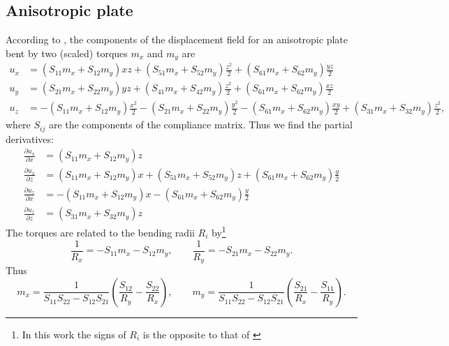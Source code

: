 \documentclass[11pt,a4paper]{article}
\begin{document}
\subsection{Anisotropic plate}
According to \cite{Sanchez_del_Rio_2015}, the components of the displacement field for an anisotropic plate bent by two (scaled) torques $m_x$ and $m_y$ are
\begin{align}
u_x &= (S_{11} m_x + S_{12} m_y) x z + (S_{51} m_x + S_{52} m_y)\frac{z^2}{2} + (S_{61} m_x +S_{62} m_y) \frac{y z}{2} \\
u_y &= (S_{21} m_x + S_{22} m_y) y z + (S_{41} m_x + S_{42} m_y)\frac{z^2}{2} + (S_{61} m_x +S_{62} m_y) \frac{x z}{2} \\
u_z &= -(S_{11} m_x + S_{12} m_y)\frac{x^2}{2} -(S_{21} m_x + S_{22} m_y)\frac{y^2}{2} -(S_{61} m_x +S_{62} m_y) \frac{x y}{2} +(S_{31} m_x + S_{32} m_y)\frac{z^2}{2},
\end{align} 
where $S_{ij}$ are the components of the compliance matrix. Thus we find the partial derivatives:
\begin{align}
\frac{\partial u_x}{\partial x} &= (S_{11} m_x + S_{12} m_y) z \\
\frac{\partial u_x}{\partial z} &= (S_{11} m_x + S_{12} m_y) x + (S_{51} m_x + S_{52} m_y) z 
+ (S_{61} m_x + S_{62} m_y) \frac{y}{2}\\
\frac{\partial u_z}{\partial x} &= -(S_{11} m_x + S_{12} m_y) x -(S_{61} m_x + S_{62} m_y) \frac{y}{2} \\
\frac{\partial u_z}{\partial z} &= (S_{31} m_x + S_{32} m_y) z
\end{align} 
The torques are related to the bending radii $R_i$ by\footnote{In this work the signs of $R_i$ is the opposite to that of \cite{Sanchez_del_Rio_2015}}
\begin{equation}
\frac{1}{R_x} = -S_{11} m_x - S_{12} m_y, \qquad
\frac{1}{R_y} = -S_{21} m_x - S_{22} m_y.
\end{equation}
Thus
\begin{equation}
m_x = \frac{1}{S_{11}S_{22}-S_{12}S_{21}}\left(\frac{S_{12}}{R_y}-\frac{S_{22}}{R_x} \right), \qquad
m_y = \frac{1}{S_{11}S_{22}-S_{12}S_{21}}\left(\frac{S_{21}}{R_x}-\frac{S_{11}}{R_y} \right).
\label{eq:ms}
\end{equation}
\end{document}
